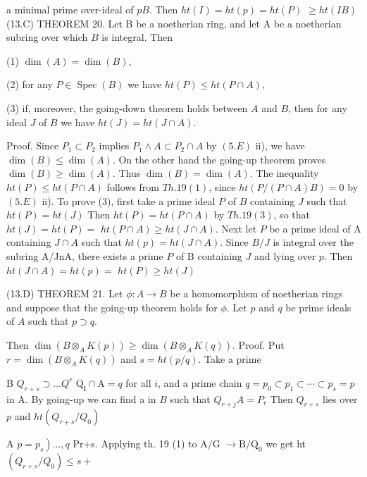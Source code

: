 a minimal prime over-ideal of $p B$. Then $h t(I)=h t(p)=h t(P)$ $\geqslant h t(I B)$ (13.C) THEOREM 20. Let B be a noetherian ring, and let A be a noetherian subring over which $B$ is integral. Then

(1) $\operatorname{dim}(A)=\operatorname{dim}(B)$,

(2) for any $P \in \operatorname{Spec}(B)$ we have $h t(P) \leqslant h t(P \cap A)$,

(3) if, moreover, the going-down theorem holds between $A$ and $B$, then for any ideal $J$ of $B$ we have $h t(J)=h t(J \cap A)$.

Proof. Since $P_{1} \subset P_{2}$ implies $P_{1} \wedge A \subset P_{2} \cap A$ by $(5 . E)$ ii), we have $\operatorname{dim}(B) \leqslant \operatorname{dim}(A)$. On the other hand the going-up theorem proves $\operatorname{dim}(B) \geqslant \operatorname{dim}(A)$. Thus $\operatorname{dim}(B)=\operatorname{dim}(A)$. The inequality $h t(P) \leqslant h t(P \cap A)$ follows from $T h .19(1)$, since $h t(P /(P \cap A) B)=0$ by $(5 . E)$ ii). To prove (3), first take a prime ideal $P$ of $B$ containing $J$ such that $h t(P)=h t(J)$ Then $h t(P)=h t(P \cap A)$ by $T h .19(3)$, so that $h t(J)=h t(P)=$ $h t(P \cap A) \geqslant h t(J \cap A)$. Next let $P$ be a prime ideal of A containing $J \cap A$ such that $h t(p)=h t(J \cap A)$. Since $B / J$ is integral over the subring A/JnA, there exists a prime $P$ of B containing $J$ and lying over $p .$ Then $h t(J \cap A)=h t(p)=$ $h t(P) \geqslant h t(J)$

(13.D) THEOREM 21. Let $\phi: A \rightarrow B$ be a homomorphism of noetherian rings and suppose that the going-up theorem holds for $\phi$. Let $p$ and $q$ be prime ideals of $A$ such that $p \supset q$.

Then $\operatorname{dim}\left(B \otimes_{A} K(p)\right) \geqslant \operatorname{dim}\left(B \otimes_{A} K(q)\right)$. Proof. Put $r=\operatorname{dim}\left(B \otimes_{A} K(q)\right)$ and $s=h t(p / q)$. Take a prime

B $Q_{r+s} \supset \ldots Q^{r}$ $\mathrm{Q}_{\mathbf{i}} \cap \mathrm{A}=q$ for all $i$, and a prime chain $q=p_{0} \subset p_{1} \subset \cdots \subset p_{s}=p$ in A. By going-up we can find a in $B$ such that $Q_{r+j} A=P_{r}$ Then $Q_{r+s}$ lies over $p$ and $h t\left(Q_{r+s} / Q_{0}\right)$

A $\left.p=p_{s}\right) \ldots, q$ Pr+s. Applying th. 19 (1) to $\mathrm{A} / \mathrm{G}$ $\rightarrow \mathrm{B} / \mathrm{Q}_{0}$ we get ht $\left(Q_{r+s} / Q_{0}\right) \leqslant s+$

